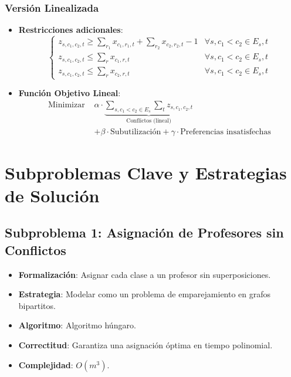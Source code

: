\documentclass[12pt, a4paper]{article}
\begin{document}
\subsubsection{Versión Linealizada}
\begin{itemize}
    \item \textbf{Restricciones adicionales}:
    \[
    \begin{cases}
    z_{s, c_1, c_2, t} \geq \sum_{r_1} x_{c_1, r_1, t} + \sum_{r_2} x_{c_2, r_2, t} - 1 & \forall s, c_1 < c_2 \in E_s, t \\
    z_{s, c_1, c_2, t} \leq \sum_{r} x_{c_1, r, t} & \forall s, c_1 < c_2 \in E_s, t \\
    z_{s, c_1, c_2, t} \leq \sum_{r} x_{c_2, r, t} & \forall s, c_1 < c_2 \in E_s, t
    \end{cases}
    \]
    
    \item \textbf{Función Objetivo Lineal}:
    \[
    \begin{aligned}
    \text{Minimizar } & \alpha \cdot \underbrace{\sum_{s, c_1 < c_2 \in E_s} \sum_{t} z_{s, c_1, c_2, t}}_{\text{Conflictos (lineal)}} \\
    & + \beta \cdot \text{Subutilización} + \gamma \cdot \text{Preferencias insatisfechas}
    \end{aligned}
    \]
\end{itemize}

\section{Subproblemas Clave y Estrategias de Solución}
\subsection{Subproblema 1: Asignación de Profesores sin Conflictos}
\begin{itemize}
    \item \textbf{Formalización}: Asignar cada clase a un profesor sin superposiciones.
    \item \textbf{Estrategia}: Modelar como un problema de emparejamiento en grafos bipartitos.
    \item \textbf{Algoritmo}: Algoritmo húngaro.
    \item \textbf{Correctitud}: Garantiza una asignación óptima en tiempo polinomial.
    \item \textbf{Complejidad}: \( O(m^3) \).
\end{itemize}
\end{document}
